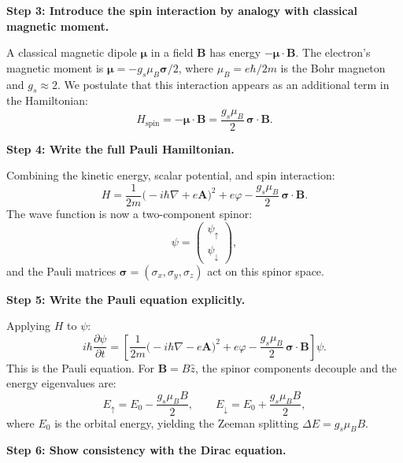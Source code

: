 \textbf{Step 3: Introduce the spin interaction by analogy with classical magnetic moment.}

A classical magnetic dipole $\boldsymbol{\mu}$ in a field $\mathbf{B}$ has energy $-\boldsymbol{\mu}\cdot\mathbf{B}$. The electron's magnetic moment is $\boldsymbol{\mu} = -g_s \mu_B \boldsymbol{\sigma}/2$, where $\mu_B = e\hbar/2m$ is the Bohr magneton and $g_s \approx 2$. We postulate that this interaction appears as an additional term in the Hamiltonian:
\begin{equation}
H_{\text{spin}} = -\boldsymbol{\mu}\cdot\mathbf{B} = \frac{g_s \mu_B}{2}\,\boldsymbol{\sigma}\cdot\mathbf{B}.
\end{equation}

\textbf{Step 4: Write the full Pauli Hamiltonian.}

Combining the kinetic energy, scalar potential, and spin interaction:
\begin{equation}
H = \frac{1}{2m}\bigl(-i\hbar\nabla + e\mathbf{A}\bigr)^{2} + e\varphi - \frac{g_s\mu_B}{2}\,\boldsymbol{\sigma}\cdot\mathbf{B}.
\end{equation}
The wave function is now a two-component spinor:
\begin{equation}
\psi = \begin{pmatrix}\psi_{\uparrow}\\\psi_{\downarrow}\end{pmatrix},
\end{equation}
and the Pauli matrices $\boldsymbol{\sigma} = (\sigma_x, \sigma_y, \sigma_z)$ act on this spinor space.

\textbf{Step 5: Write the Pauli equation explicitly.}

Applying $H$ to $\psi$:
\begin{equation}
\boxed{\;i\hbar\frac{\partial\psi}{\partial t} = \left[\frac{1}{2m}\bigl(-i\hbar\nabla - e\mathbf{A}\bigr)^{2} + e\varphi - \frac{g_s\mu_B}{2}\,\boldsymbol{\sigma}\cdot\mathbf{B}\right]\psi.\;}
\end{equation}
This is the Pauli equation. For $\mathbf{B} = B\hat{z}$, the spinor components decouple and the energy eigenvalues are:
\begin{equation}
E_{\uparrow} = E_0 - \frac{g_s\mu_B B}{2}, \qquad E_{\downarrow} = E_0 + \frac{g_s\mu_B B}{2},
\end{equation}
where $E_0$ is the orbital energy, yielding the Zeeman splitting $\Delta E = g_s\mu_B B$.

\textbf{Step 6: Show consistency with the Dirac equation.}

